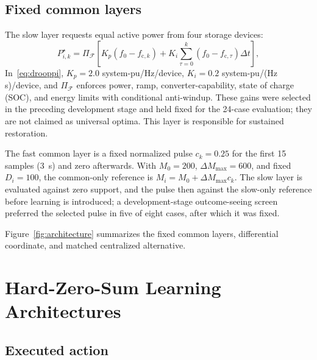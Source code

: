 \documentclass[conference,a4paper]{IEEEtran}
\begin{document}
\subsection{Fixed common layers}

The slow layer requests equal active power from four storage devices:
\begin{equation}
 P^\star_{i,k}=\Pi_{\mathcal F}\!\left[
 K_p(f_0-f_{\mathrm c,k})+
 K_i\sum_{\tau=0}^{k}(f_0-f_{\mathrm c,\tau})\Delta t
 \right],
\label{eq:drooppi}
\end{equation}
In~\eqref{eq:drooppi}, \(K_p=2.0\) system-pu/Hz/device,
\(K_i=0.2\) system-pu/(Hz\,s)/device, and \(\Pi_{\mathcal F}\) enforces
power, ramp, converter-capability, state of charge (SOC), and energy limits
with conditional
anti-windup. These gains were selected in the preceding development stage and
held fixed for the 24-case evaluation; they are not claimed as universal
optima. This layer is responsible for sustained restoration.

The fast common layer is a fixed normalized pulse \(c_k=0.25\) for the first
15 samples (\SI{3}{s}) and zero afterwards. With \(M_0=200\),
\(\Delta M_{\max}=600\), and fixed \(D_i=100\), the common-only reference is
\(M_i=M_0+\Delta M_{\max}c_k\). The slow layer is evaluated against zero
support, and the pulse then against the slow-only reference before learning is
introduced; a development-stage outcome-seeing screen preferred the selected
pulse in five of eight cases, after which it was fixed.

Figure~\ref{fig:architecture} summarizes the fixed common layers, differential
coordinate, and matched centralized alternative.


\section{Hard-Zero-Sum Learning Architectures}

\subsection{Executed action}
\end{document}

